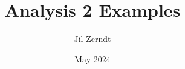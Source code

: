 \documentclass[a4paper, fontsize = 8pt, landscape]{scrartcl}
\title{Analysis 2 Examples}
\author{Jil Zerndt}
\date{May 2024}
\begin{document}
\begin{multicols}{3}
	\thispagestyle{TitlePageStyle}
	\maketitle
	
	\raggedcolumns
	
	\raggedcolumns
	
	\raggedcolumns
	
	\raggedcolumns
\end{multicols}
\end{document}
